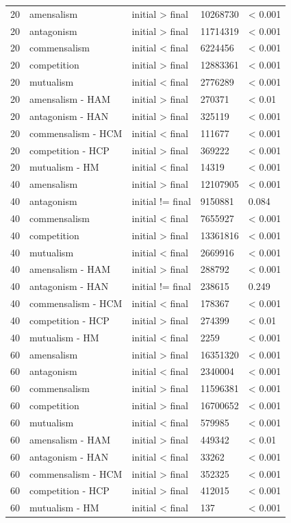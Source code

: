 \begin{longtable}[]{@{}lllll@{}}
20 & amensalism & initial \textgreater{} final & 10268730 & \textless{}
0.001\tabularnewline
20 & antagonism & initial \textgreater{} final & 11714319 & \textless{}
0.001\tabularnewline
20 & commensalism & initial \textless{} final & 6224456 & \textless{}
0.001\tabularnewline
20 & competition & initial \textgreater{} final & 12883361 & \textless{}
0.001\tabularnewline
20 & mutualism & initial \textless{} final & 2776289 & \textless{}
0.001\tabularnewline
20 & amensalism - HAM & initial \textgreater{} final & 270371 &
\textless{} 0.01\tabularnewline
20 & antagonism - HAN & initial \textgreater{} final & 325119 &
\textless{} 0.001\tabularnewline
20 & commensalism - HCM & initial \textless{} final & 111677 &
\textless{} 0.001\tabularnewline
20 & competition - HCP & initial \textgreater{} final & 369222 &
\textless{} 0.001\tabularnewline
20 & mutualism - HM & initial \textless{} final & 14319 & \textless{}
0.001\tabularnewline
40 & amensalism & initial \textgreater{} final & 12107905 & \textless{}
0.001\tabularnewline
40 & antagonism & initial != final & 9150881 & 0.084\tabularnewline
40 & commensalism & initial \textless{} final & 7655927 & \textless{}
0.001\tabularnewline
40 & competition & initial \textgreater{} final & 13361816 & \textless{}
0.001\tabularnewline
40 & mutualism & initial \textless{} final & 2669916 & \textless{}
0.001\tabularnewline
40 & amensalism - HAM & initial \textgreater{} final & 288792 &
\textless{} 0.001\tabularnewline
40 & antagonism - HAN & initial != final & 238615 & 0.249\tabularnewline
40 & commensalism - HCM & initial \textless{} final & 178367 &
\textless{} 0.001\tabularnewline
40 & competition - HCP & initial \textgreater{} final & 274399 &
\textless{} 0.01\tabularnewline
40 & mutualism - HM & initial \textless{} final & 2259 & \textless{}
0.001\tabularnewline
60 & amensalism & initial \textgreater{} final & 16351320 & \textless{}
0.001\tabularnewline
60 & antagonism & initial \textless{} final & 2340004 & \textless{}
0.001\tabularnewline
60 & commensalism & initial \textgreater{} final & 11596381 &
\textless{} 0.001\tabularnewline
60 & competition & initial \textgreater{} final & 16700652 & \textless{}
0.001\tabularnewline
60 & mutualism & initial \textless{} final & 579985 & \textless{}
0.001\tabularnewline
60 & amensalism - HAM & initial \textgreater{} final & 449342 &
\textless{} 0.01\tabularnewline
60 & antagonism - HAN & initial \textless{} final & 33262 & \textless{}
0.001\tabularnewline
60 & commensalism - HCM & initial \textgreater{} final & 352325 &
\textless{} 0.001\tabularnewline
60 & competition - HCP & initial \textgreater{} final & 412015 &
\textless{} 0.001\tabularnewline
60 & mutualism - HM & initial \textless{} final & 137 & \textless{}
0.001\tabularnewline
\bottomrule

\end{longtable}

